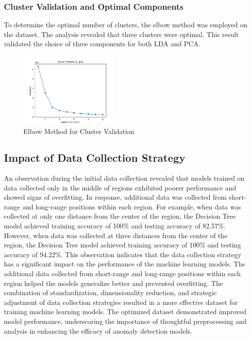 \documentclass[conference]{IEEEtran}
\begin{document}
\subsubsection{Cluster Validation and Optimal Components}
To determine the optimal number of clusters, the elbow method was employed on the dataset. The analysis revealed that three clusters were optimal. This result validated the choice of three components for both LDA and PCA.
\begin{figure}[htbp]
    \centering
    \includegraphics[width=5cm]{figs/nn/elbow.png}
    \caption{Elbow Method for Cluster Validation}
    \label{fig6}
\end{figure}
\subsection{Impact of Data Collection Strategy}
An observation during the initial data collection revealed that models trained on data collected only in the middle of regions exhibited poorer performance and showed signs of overfitting. In response, additional data was collected from short-range and long-range positions within each region. For example, when data was collected at only one distance from the center of the region, the Decision Tree model achieved training accuracy of 100\% and testing accuracy of 82.57\%. However, when data was collected at three distances from the center of the region, the Decision Tree model achieved training accuracy of 100\% and testing accuracy of 94.22\%. This observation indicates that the data collection strategy has a significant impact on the performance of the machine learning models. The additional data collected from short-range and long-range positions within each region helped the models generalize better and prevented overfitting.
The combination of standardization, dimensionality reduction, and strategic adjustment of data collection strategies resulted in a more effective dataset for training machine learning models. The optimized dataset demonstrated improved model performance, underscoring the importance of thoughtful preprocessing and analysis in enhancing the efficacy of anomaly detection models.
\end{document}
